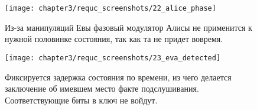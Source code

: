 \begin{figure}[h]
  \texttt{[image: chapter3/requc\_screenshots/22\_alice\_phase]}
  \caption{Из-за манипуляций Евы фазовый модулятор Алисы не применится к нужной половинке состояния, так как та не придет вовремя.}
\end{figure}

\begin{figure}[h]
  \texttt{[image: chapter3/requc\_screenshots/23\_eva\_detected]}
  \caption{Фиксируется задержка состояния по времени, из чего делается заключение об имевшем место факте подслушивания. Соответствующие биты в ключ не войдут.}
\end{figure}

\FloatBarrier